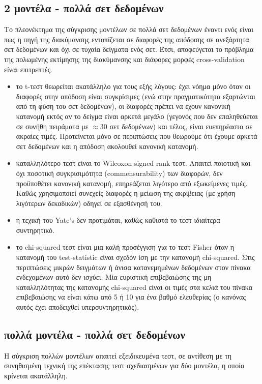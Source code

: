 \documentclass[]{article}
\numberwithin{equation}{section}		%
\numberwithin{figure}{section}			%
\numberwithin{table}{section}				%
\begin{document}
    \subsection{2 μοντέλα - πολλά σετ δεδομένων}
    Το πλεονέκτημα της σύγκρισης μοντέλων σε πολλά σετ δεδομένων έναντι ενός είναι πως η πηγή της διακύμανσης εντοπίζεται σε διαφορές της απόδοσης σε ανεξάρτητα σετ δεδομένων και όχι σε τυχαία δείγματα ενός σετ. Έτσι, αποφεύγεται το πρόβλημα της πολωμένης εκτίμησης της διακύμανσης και διάφορες μορφές cross-validation είναι επιτρεπτές. 
    \begin{itemize}
    	\item το t-τεστ θεωρείται ακατάλληλο για τους εξής λόγους: έχει νόημα μόνο όταν οι διαφορές στην απόδοση είναι συγκρίσιμες (ενώ στην πραγματικότητα εξαρτώνται από τη φύση του σετ δεδομένων), οι διαφορές πρέπει να έχουν κανονική κατανομή εκτός αν το δείγμα είναι αρκετά μεγάλο (γεγονός που δεν επαληθεύεται σε συνήθη πειράματα με $\approx 30$  σετ δεδομένων) και τέλος, είναι ευεπηρέαστο σε ακραίες τιμές. Προτείνεται μόνο σε περιπτώσεις που θεωρούμε ότι έχουμε αρκετά σετ δεδομένων και η απόδοση ακολουθεί κανονική κατανομή.
    	\item καταλληλότερο τεστ είναι το Wilcoxon signed rank τεστ. Απαιτεί ποιοτική και όχι ποσοτική συγκρισιμότητα (commensurability) των διαφορών, δεν προϋποθέτει κανονική κατανομή, επηρεάζεται λιγότερο από εξωκείμενες τιμές. Καθώς χρησιμοποιεί συνεχείς διαφορές η μείωση της ακρίβειας (με χρήση λιγότερων δεκαδικών) οδηγεί σε εξασθένησή του. 
    	\item η τεχική του Yate's δεν προτιμάται, καθώς καθιστά το τεστ ιδιαίτερα συντηρητικό.
    	\item το chi-squared τεστ είναι μια καλή προσέγγιση για το τεστ Fisher όταν η κατανομή του test-statistic είναι σχεδόν ίση με την κατανομή chi-squared. Στις περιπτώσεις μικρών δειγμάτων ή άνισα κατανεμημένων δεδομένων στον πίνακα ενδεχομένων αυτό δεν ισχύει. Μία ευριστική επιβεβαιώσης της μη καταλληλότητας της κατανομής chi-squared είναι οι τιμές στα κελιά του πίνακα επιβεβαιώσης να είναι κάτω από 5 ή 10 για ένα βαθμό ελευθερίας (ο κανόνας αυτός έχει αποδειχθεί υπερσυντηρητικός). \citep{Fisher}
    \end{itemize}
    \subsection{πολλά μοντέλα - πολλά σετ δεδομένων}
    Η σύγκριση πολλών μοντέλων απαιτεί εξειδικευμένα τεστ, σε αντίθεση με τη συνηθισμένη τεχνική της επέκτασης τεστ σχεδιασμένων για δύο μοντέλα, η οποία κρίνεται ακατάλληλη.
   
\end{document}
